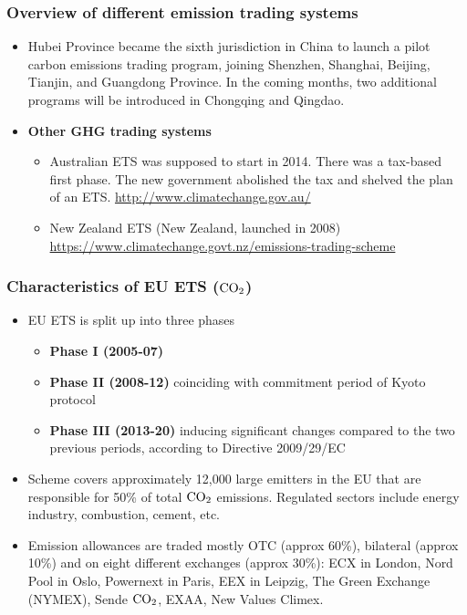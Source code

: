 {  \begin{frame}
  \frametitle{Overview of different emission trading systems}
  \begin{itemize}
    \item<1->
 Hubei Province became the sixth jurisdiction in China to launch a pilot carbon emissions trading program, joining Shenzhen, Shanghai, Beijing, Tianjin, and Guangdong Province. In the coming months, two additional programs will be introduced in Chongqing and Qingdao.

  \item<2-> \textbf{Other GHG trading systems}
        \begin{itemize}
        \item Australian ETS was supposed to start in 2014. There was a  tax-based first phase. The new government abolished the tax and shelved the plan of an ETS.
        \url{http://www.climatechange.gov.au/}
        \item New Zealand ETS (New Zealand, launched in 2008)
        \url{https://www.climatechange.govt.nz/emissions-trading-scheme}
        \end{itemize}
   \end{itemize}
\end{frame}

\begin{frame}
  \frametitle{Characteristics of EU ETS ($\textnormal{CO}_2$)}
  \begin{itemize}
  \item<1-> EU ETS is split up into three phases
  \begin{itemize}
  \item \textbf{Phase I (2005-07)}
  \item \textbf{Phase II (2008-12)} coinciding with commitment period of Kyoto protocol
  \item \textbf{Phase III (2013-20)} inducing significant changes compared to the two previous periods, according to Directive 2009/29/EC
  \end{itemize}
  \item<2-> Scheme covers approximately 12,000 large emitters in the EU that are responsible for 50\% of total $\textnormal{CO}_2$ emissions. Regulated sectors include energy industry, combustion, cement, etc.
  \item<3->  Emission allowances are traded mostly OTC (approx 60\%), bilateral (approx 10\%) and on eight different exchanges (approx 30\%):
  ECX in London, Nord Pool in Oslo, Powernext in Paris, EEX in Leipzig, The Green Exchange (NYMEX), Sende $\textnormal{CO}_2$, EXAA, New Values Climex.
  \end{itemize}
  \end{frame}

}
